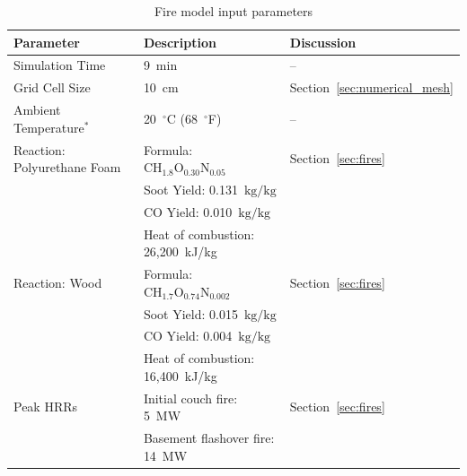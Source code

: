 \documentclass[12pt,oneside]{book}
\renewcommand{\C}{\mbox{C}}
\renewcommand{\H}{\mbox{H}}
\renewcommand{\O}{\mbox{O}}
\newcommand{\N}{\mbox{N}}
\begin{document}
\begin{table}[!ht]
\caption[Fire model input parameters]
{Fire model input parameters}
\begin{tabular}{lll}
\toprule
Parameter                                         &  Description                                  &  Discussion                        \\
\midrule
Simulation Time                                   &  9~min                                        &  --                                \\
Grid Cell Size                                    &  10~cm                                        &  Section~\ref{sec:numerical_mesh}  \\
Ambient Temperature$^*$                           &  20~$^{\circ}$C (68~$^{\circ}$F)              &  --                                \\
Reaction: Polyurethane Foam~\cite{SFPE:Tewarson}  &  Formula: $\C\H_{1.8}\O_{0.30}\N_{0.05}$      &  Section~\ref{sec:fires}           \\
                                                  &  Soot Yield: 0.131~$\mathrm{kg}/\mathrm{kg}$  &                                    \\
                                                  &  CO Yield: 0.010~$\mathrm{kg}/\mathrm{kg}$    &                                    \\
                                                  &  Heat of combustion: 26,200~kJ/kg             &                                    \\
Reaction: Wood~\cite{SFPE:Tewarson}               &  Formula: $\C\H_{1.7}\O_{0.74}\N_{0.002}$     &  Section~\ref{sec:fires}           \\
                                                  &  Soot Yield: 0.015~$\mathrm{kg}/\mathrm{kg}$  &                                    \\
                                                  &  CO Yield: 0.004~$\mathrm{kg}/\mathrm{kg}$    &                                    \\
                                                  &  Heat of combustion: 16,400~kJ/kg             &                                    \\
Peak HRRs                                         &  Initial couch fire: 5~MW                     &  Section~\ref{sec:fires}           \\
                                                  &  Basement flashover fire: 14~MW               &                                    \\

\end{tabular}
\end{table}
\end{document}
